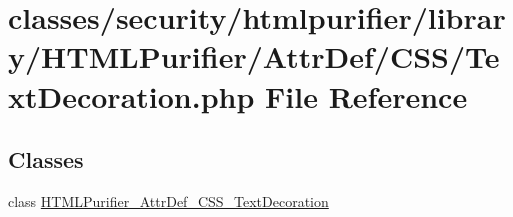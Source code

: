 \hypertarget{TextDecoration_8php}{\section{classes/security/htmlpurifier/library/\+H\+T\+M\+L\+Purifier/\+Attr\+Def/\+C\+S\+S/\+Text\+Decoration.php File Reference}
\label{TextDecoration_8php}
}
\subsection*{Classes}
\begin{DoxyCompactItemize}
\item 
class \hyperlink{classHTMLPurifier__AttrDef__CSS__TextDecoration}{H\+T\+M\+L\+Purifier\+\_\+\+Attr\+Def\+\_\+\+C\+S\+S\+\_\+\+Text\+Decoration}
\end{DoxyCompactItemize}
